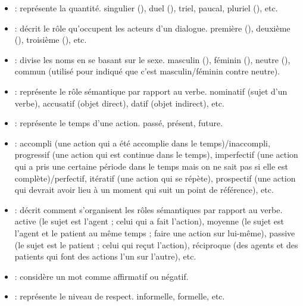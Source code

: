 \documentclass{KodeBook}
\begin{document}
\begin{itemize}
	\item {} : représente la quantité. 
	singulier (), duel (), triel, paucal, pluriel (), etc. 
	
	\item {} : décrit le rôle qu'occupent les acteurs d'un dialogue. 
	première (), deuxième (), troisième (), etc.
	
	\item {} : divise les noms en se basant sur le sexe. 
	masculin (), féminin (), neutre (), commun (utilisé pour indiqué que c'est masculin/féminin contre neutre).
	
	\item {} : représente le rôle sémantique par rapport au verbe. 
	nominatif (sujet d'un verbe), accusatif (objet direct), datif (objet indirect), etc.
	
	\item {} : représente le temps d'une action. passé, présent, future.
	
	\item {} : accompli (une action qui a été accomplie dans le temps)/inaccompli, progressif (une action qui est continue dans le temps), imperfectif (une action qui a pris une certaine période dans le temps mais on ne sait pas si elle est complète)/perfectif, itératif (une action qui se répète), prospectif (une action qui devrait avoir lieu à un moment qui suit un point de référence), etc.
	
	\item {} : décrit comment s'organisent les rôles sémantiques par rapport au verbe.
	active (le sujet est l'agent ; celui qui a fait l'action), moyenne (le sujet est l'agent et le patient au même temps ; faire une action sur lui-même), passive (le sujet est le patient ; celui qui reçut l'action), réciproque (des agents et des patients qui font des actions l'un sur l'autre), etc.
	
	\item {} : considère un mot comme affirmatif ou négatif.
	\item {} : représente le niveau de respect. informelle, formelle, etc.
\end{itemize}
\end{document}
